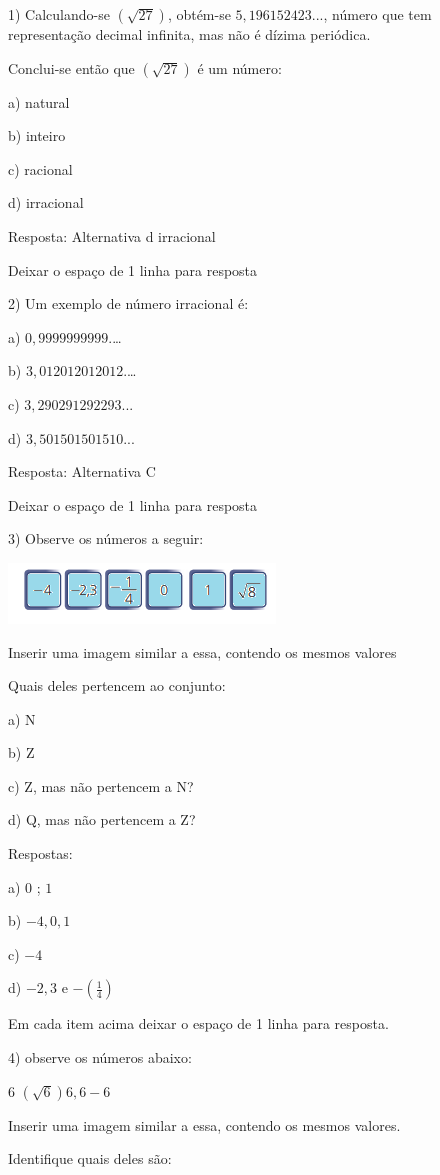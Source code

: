 1) Calculando-se $(\sqrt{27})$, obtém-se $5,196152423$..., número que tem
representação decimal infinita, mas não é dízima periódica.

Conclui-se então que $(\sqrt{27})$ é um número:


a) natural

b) inteiro

c) racional

d) irracional

Resposta: Alternativa d irracional

Deixar o espaço de 1 linha para resposta

2) Um exemplo de número irracional é:

a) $0,9999999999$.\ldots{}

b) $3,012012012012$.\ldots{}

c) $3,290291292293$...

d) $3,501501501510$...

Resposta: Alternativa C

Deixar o espaço de 1 linha para resposta

3) Observe os números a seguir:

\includegraphics[width=2.79167in,height=0.63542in]{./imgSAEB_8_MAT/media/image1.png}

Inserir uma imagem similar a essa, contendo os mesmos valores

Quais deles pertencem ao conjunto:

a) N

b) Z

c) Z, mas não pertencem a N?

d) Q, mas não pertencem a Z?

Respostas:

a) $0$ ; $1$

b) $-4, 0, 1$

c) $-4$

d) $-2,3$ e $- (\frac{1}{4})$

Em cada item acima deixar o espaço de 1 linha para resposta.

4) observe os números abaixo:

6 $(\sqrt{6}) 6,6 -6$

Inserir uma imagem similar a essa, contendo os mesmos valores.

Identifique quais deles são:

